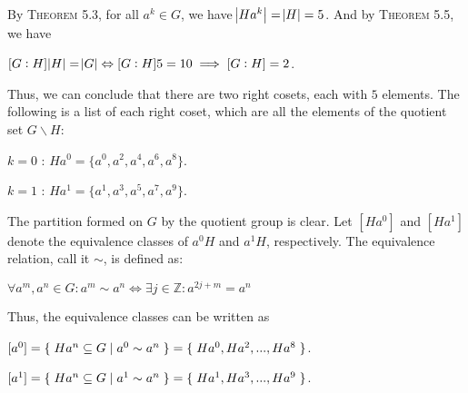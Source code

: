\documentclass[12pt, a4paper]{article}
\begin{document}
\vspace{4mm}

By \textsc{Theorem 5.3}, for all $a^k\in G$, we have $\abs{H a^k}=\abs{H}=5$. And by \textsc{Theorem 5.5}, we have\par

\vspace{4mm}

\centerline{$[G:H]\abs{H}=\abs{G}\Leftrightarrow [G:H]5=10\implies [G:H]=2$.}

\vspace{8mm}

Thus, we can conclude that there are two right cosets, each with $5$ elements. The following is a list of each right coset, which are all the elements of the quotient set $G\backslash H$:

\vspace{3mm}

\begin{description}
\item{$k=0$ : }$Ha^0=\{a^0, a^2, a^4, a^6, a^8\}$.
\item{$k=1$ : }$Ha^1=\{a^1, a^3, a^5, a^7, a^9\}$.
\end{description}

\vspace{4mm}

The partition formed on $G$ by the quotient group is clear. Let $[Ha^0]$ and $[Ha^1]$ denote the equivalence classes of $a^0 H$ and $a^1 H$, respectively. The equivalence relation, call it $\sim$, is defined as: 

\vspace{4mm}

\centerline{$\forall a^m,a^n\in G\colon a^m\sim a^n\Leftrightarrow\exists j\in \mathbb{Z}\colon a^{2j+m}=a^n$}

\vspace{6mm}

Thus, the equivalence classes can be written as

\vspace{8mm}

\centerline{$[a^0]=\{\hspace{1mm}Ha^n\subseteq G\mid a^0\sim a^n\hspace{1mm}\}=\{\hspace{1mm}Ha^0, Ha^2, ... , Ha^8\hspace{1mm}\}$.}
\vspace{2mm}
\centerline{$[a^1]=\{\hspace{1mm}Ha^n\subseteq G\mid a^1\sim a^n\hspace{1mm}\}=\{\hspace{1mm}Ha^1, Ha^3, ... , Ha^9\hspace{1mm}\}$.}
\end{document}
